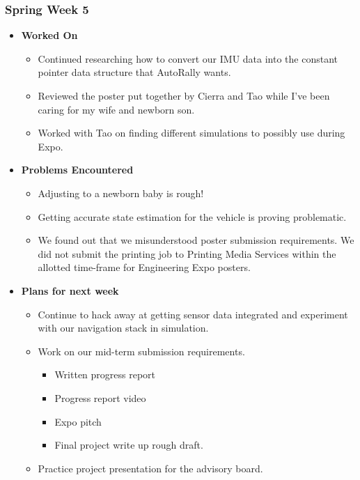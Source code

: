\documentclass[compsoc,draftclsnofoot,onecolumn,10pt]{IEEEtran}
\begin{document}
\subsubsection{Spring Week 5}
\begin{itemize}
    \item {\textbf{Worked On}}
    \begin{itemize}
        \item Continued researching how to convert our IMU data into the constant pointer data structure that AutoRally wants.
        \item Reviewed the poster put together by Cierra and Tao while I've been caring for my wife and newborn son.
        \item Worked with Tao on finding different simulations to possibly use during Expo.
    \end{itemize}

    \item {\textbf{Problems Encountered}}
    \begin{itemize}
        \item Adjusting to a newborn baby is rough!
        \item Getting accurate state estimation for the vehicle is proving problematic.
        \item We found out that we misunderstood poster submission requirements. We did not submit the printing job to Printing Media Services within the allotted time-frame for Engineering Expo posters.
    \end{itemize}

    \item{\textbf{Plans for next week}}
    \begin{itemize}
        \item Continue to hack away at getting sensor data integrated and experiment with our navigation stack in simulation.
        \item Work on our mid-term submission requirements.
        \begin{itemize}
            \item Written progress report
            \item Progress report video
            \item Expo pitch
            \item Final project write up rough draft.
        \end{itemize}
        \item Practice project presentation for the advisory board.
    \end{itemize}
\end{itemize}
\end{document}
